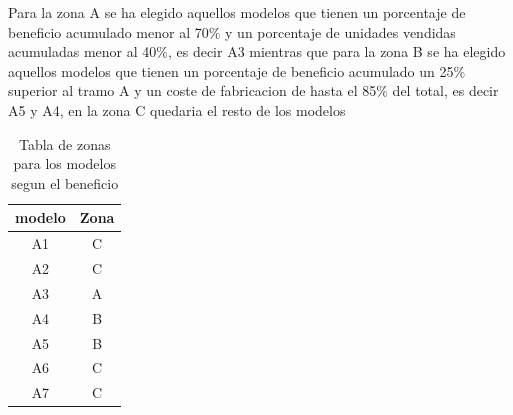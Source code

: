 \documentclass{report}
\begin{document}
\begin{raggedright}
Para la zona A se ha elegido aquellos modelos que tienen un porcentaje de beneficio acumulado menor al 70$\%$ y un porcentaje de unidades vendidas acumuladas menor al 40$\%$, es decir A3 mientras que para la zona B se ha elegido aquellos modelos que tienen un porcentaje de beneficio acumulado un 25$\%$ superior al tramo A y un coste de fabricacion de hasta el 85$\%$ del total, es decir A5 y A4, en la zona C quedaria el resto de los modelos\\
\begin{table}[h]
	\centering
	\begin{tabular}{cc}
		\toprule
		\textbf{modelo} & \textbf{Zona}  \\
		\midrule
		A1 & C \\
		A2 & C \\
		A3 & A \\
		A4 & B \\
		A5 & B \\
		A6 & C \\
		A7 & C \\
		\bottomrule
	\end{tabular}
	\caption{Tabla de zonas para los modelos segun el beneficio}
\end{table}
\newpage

\end{raggedright}
\end{document}
